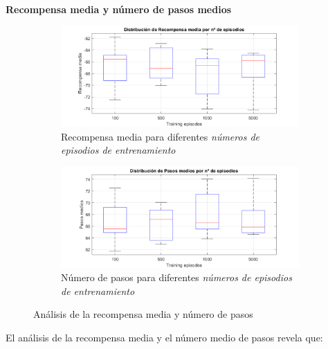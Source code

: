 \

\textbf{Recompensa media y número de pasos medios}

\begin{figure}[H]
    \centering
    \begin{subfigure}{0.8\textwidth}
        \centering
        \includegraphics[width=\textwidth]{../../experiments/directEstimation/experiment-2/results/reward.png}
        \caption{Recompensa media para diferentes \textit{números de episodios de entrenamiento}}
        \label{fig:directEstimation2-subfig-reward}
    \end{subfigure}
    \hfill
    \begin{subfigure}{0.8\textwidth}
        \centering
        \includegraphics[width=\textwidth]{../../experiments/directEstimation/experiment-2/results/steps.png}
        \caption{Número de pasos para diferentes \textit{números de episodios de entrenamiento}}
        \label{fig:directEstimation2-subfig-steps}
    \end{subfigure}
    \caption{Análisis de la recompensa media y número de pasos}
    \label{fig:directEstimation2-reward}
\end{figure}

El análisis de la recompensa media y el número medio de pasos revela que:

